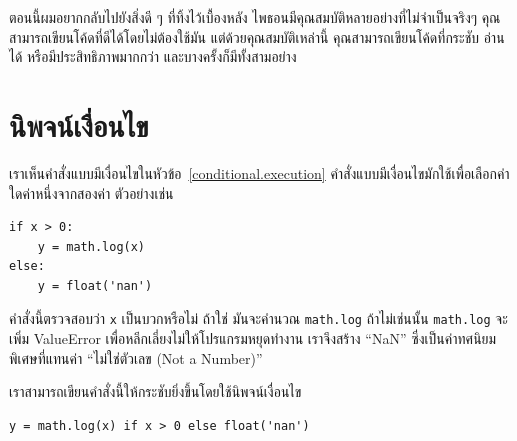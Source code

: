 ตอนนี้ผมอยากกลับไปยังสิ่งดี ๆ ที่ทิ้งไว้เบื้องหลัง ไพธอนมีคุณสมบัติหลายอย่างที่ไม่จำเป็นจริงๆ คุณสามารถเขียนโค้ดที่ดีได้โดยไม่ต้องใช้มัน 
แต่ด้วยคุณสมบัติเหล่านี้ คุณสามารถเขียนโค้ดที่กระชับ อ่านได้ หรือมีประสิทธิภาพมากกว่า และบางครั้งก็มีทั้งสามอย่าง



\section{นิพจน์เงื่อนไข} %

เราเห็นคำสั่งแบบมีเงื่อนไขในหัวข้อ~\ref{conditional.execution} คำสั่งแบบมีเงื่อนไขมักใช้เพื่อเลือกค่าใดค่าหนึ่งจากสองค่า ตัวอย่างเช่น

\begin{verbatim}
if x > 0:
    y = math.log(x)
else:
    y = float('nan')
\end{verbatim}

คำสั่งนี้ตรวจสอบว่า {\tt x} เป็นบวกหรือไม่ ถ้าใช่ มันจะคำนวณ {\tt math.log} ถ้าไม่เช่นนั้น {\tt math.log} จะเพิ่ม ValueError 
เพื่อหลีกเลี่ยงไม่ให้โปรแกรมหยุดทำงาน เราจึงสร้าง ``NaN'' ซึ่งเป็นค่าทศนิยมพิเศษที่แทนค่า ``ไม่ใช่ตัวเลข (Not a Number)''

เราสามารถเขียนคำสั่งนี้ให้กระชับยิ่งขึ้นโดยใช้นิพจน์เงื่อนไข

\begin{verbatim}
y = math.log(x) if x > 0 else float('nan')
\end{verbatim}

